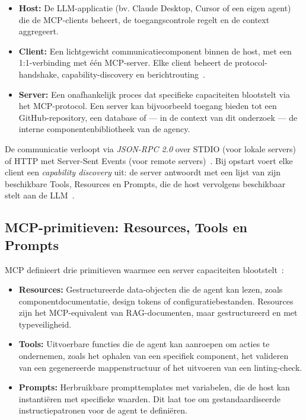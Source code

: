 \begin{itemize}
\item \textbf{Host:} De LLM-applicatie (bv. Claude Desktop, Cursor of een eigen agent) die de MCP-clients beheert, de toegangscontrole regelt en de context aggregeert.
\item \textbf{Client:} Een lichtgewicht communicatiecomponent binnen de host, met een 1:1-verbinding met één MCP-server. Elke client beheert de protocol-handshake, capability-discovery en berichtrouting~\autocite{TrueFoundryMCP2025}.
\item \textbf{Server:} Een onafhankelijk proces dat specifieke capaciteiten blootstelt via het MCP-protocol. Een server kan bijvoorbeeld toegang bieden tot een GitHub-repository, een database of --- in de context van dit onderzoek --- de interne componentenbibliotheek van de agency.
\end{itemize}

De communicatie verloopt via \textit{JSON-RPC 2.0} over STDIO (voor lokale servers) of HTTP met Server-Sent Events (voor remote servers)~\autocite{MCPSpec2025}. Bij opstart voert elke client een \textit{capability discovery} uit: de server antwoordt met een lijst van zijn beschikbare Tools, Resources en Prompts, die de host vervolgens beschikbaar stelt aan de LLM~\autocite{Schmid2025MCP}.

\subsection{MCP-primitieven: Resources, Tools en Prompts}
\label{subsec:mcp-primitieven}

MCP definieert drie primitieven waarmee een server capaciteiten blootstelt~\autocite{GoogleCloud2024}:

\begin{itemize}
\item \textbf{Resources:} Gestructureerde data-objecten die de agent kan lezen, zoals componentdocumentatie, design tokens of configuratiebestanden. Resources zijn het MCP-equivalent van RAG-documenten, maar gestructureerd en met typeveiligheid.
\item \textbf{Tools:} Uitvoerbare functies die de agent kan aanroepen om acties te ondernemen, zoals het ophalen van een specifiek component, het valideren van een gegenereerde mappenstructuur of het uitvoeren van een linting-check.
\item \textbf{Prompts:} Herbruikbare prompttemplates met variabelen, die de host kan instantiëren met specifieke waarden. Dit laat toe om gestandaardiseerde instructiepatronen voor de agent te definiëren.
\end{itemize}

